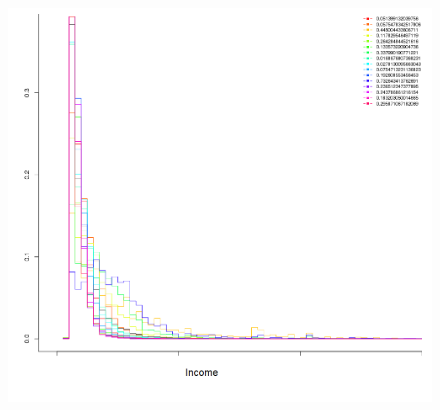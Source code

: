 \documentclass{beamer}
\begin{document}
\begin{frame}
\begin{columns}[c]
\begin{figure}
    \includegraphics[width=1\linewidth]{./Figures/income-education-zoom.png}
    \end{figure}
\end{columns}
\end{frame}
\end{document}
